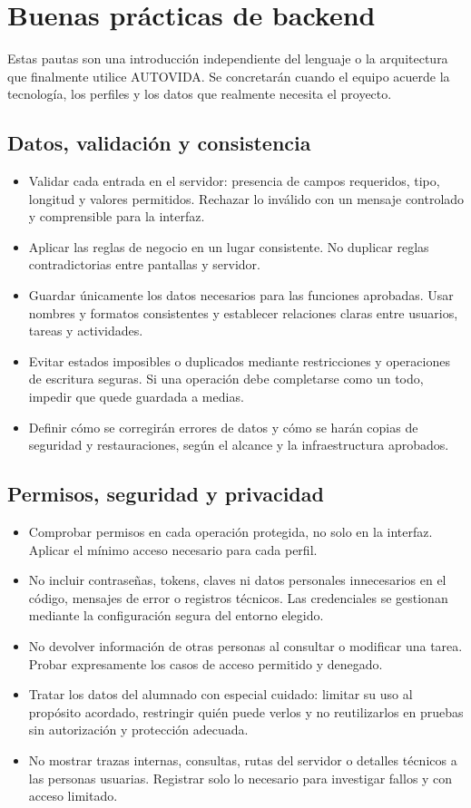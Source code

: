\section{Buenas prácticas de backend}

Estas pautas son una introducción independiente del lenguaje o la arquitectura que finalmente utilice AUTOVIDA. Se concretarán cuando el equipo acuerde la tecnología, los perfiles y los datos que realmente necesita el proyecto.

\subsection{Datos, validación y consistencia}
\begin{itemize}[leftmargin=*]
  \item Validar cada entrada en el servidor: presencia de campos requeridos, tipo, longitud y valores permitidos. Rechazar lo inválido con un mensaje controlado y comprensible para la interfaz.
  \item Aplicar las reglas de negocio en un lugar consistente. No duplicar reglas contradictorias entre pantallas y servidor.
  \item Guardar únicamente los datos necesarios para las funciones aprobadas. Usar nombres y formatos consistentes y establecer relaciones claras entre usuarios, tareas y actividades.
  \item Evitar estados imposibles o duplicados mediante restricciones y operaciones de escritura seguras. Si una operación debe completarse como un todo, impedir que quede guardada a medias.
  \item Definir cómo se corregirán errores de datos y cómo se harán copias de seguridad y restauraciones, según el alcance y la infraestructura aprobados.
\end{itemize}

\subsection{Permisos, seguridad y privacidad}
\begin{itemize}[leftmargin=*]
  \item Comprobar permisos en cada operación protegida, no solo en la interfaz. Aplicar el mínimo acceso necesario para cada perfil.
  \item No incluir contraseñas, tokens, claves ni datos personales innecesarios en el código, mensajes de error o registros técnicos. Las credenciales se gestionan mediante la configuración segura del entorno elegido.
  \item No devolver información de otras personas al consultar o modificar una tarea. Probar expresamente los casos de acceso permitido y denegado.
  \item Tratar los datos del alumnado con especial cuidado: limitar su uso al propósito acordado, restringir quién puede verlos y no reutilizarlos en pruebas sin autorización y protección adecuada.
  \item No mostrar trazas internas, consultas, rutas del servidor o detalles técnicos a las personas usuarias. Registrar solo lo necesario para investigar fallos y con acceso limitado.
\end{itemize}

